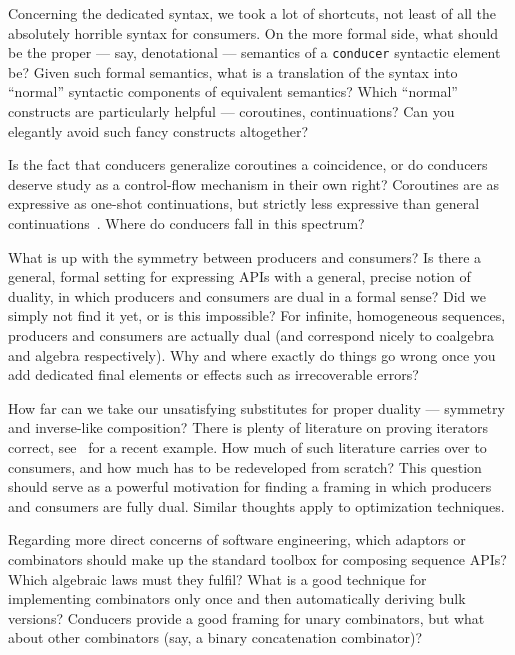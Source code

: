 \documentclass[sigplan,screen,10pt,anonymous,review]{acmart}
\begin{document}
Concerning the dedicated syntax, we took a lot of shortcuts, not least of all the absolutely horrible syntax for consumers. On the more formal side, what should be the proper --- say, denotational --- semantics of a \texttt{conducer} syntactic element be? Given such formal semantics, what is a translation of the syntax into ``normal'' syntactic components of equivalent semantics? Which ``normal'' constructs are particularly helpful --- coroutines, continuations? Can you elegantly avoid such fancy constructs altogether?

Is the fact that conducers generalize coroutines a coincidence, or do conducers deserve study as a control-flow mechanism in their own right? Coroutines are as expressive as one-shot continuations, but strictly less expressive than general continuations~\cite{moura2009revisiting}. Where do conducers fall in this spectrum?

What is up with the symmetry between producers and consumers? Is there a general, formal setting for expressing APIs with a general, precise notion of duality, in which producers and consumers are dual in a formal sense? Did we simply not find it yet, or is this impossible? For infinite, homogeneous sequences, producers and consumers are actually dual (and correspond nicely to coalgebra and algebra respectively). Why and where exactly do things go wrong once you add dedicated final elements or effects such as irrecoverable errors?

How far can we take our unsatisfying substitutes for proper duality --- symmetry and inverse-like composition? There is plenty of literature on proving iterators correct, see~\cite{bily2022compositional} for a recent example. How much of such literature carries over to consumers, and how much has to be redeveloped from scratch? This question should serve as a powerful motivation for finding a framing in which producers and consumers are fully dual. Similar thoughts apply to optimization techniques.

Regarding more direct concerns of software engineering, which adaptors or combinators should make up the standard toolbox for composing sequence APIs? Which algebraic laws must they fulfil? What is a good technique for implementing combinators only once and then automatically deriving bulk versions? Conducers provide a good framing for unary combinators, but what about other combinators (say, a binary concatenation combinator)?
\end{document}
